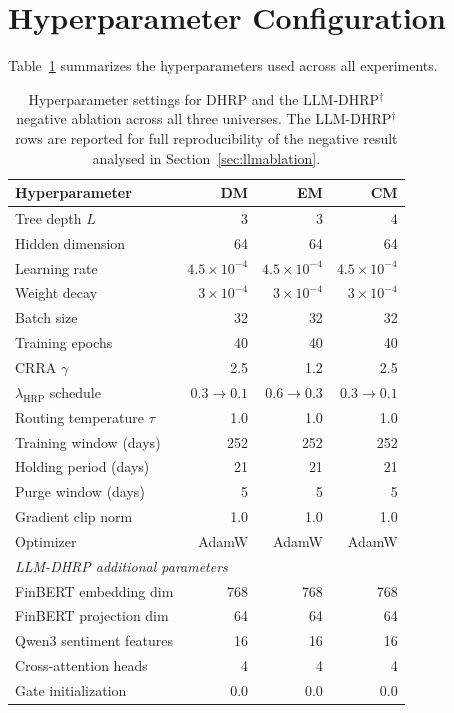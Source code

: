 \section{Hyperparameter Configuration}
\label{app:hyperparams}

Table~\ref{tab:hyperparams} summarizes the hyperparameters used across all experiments.

\begin{table}[h]
\centering
\caption{Hyperparameter settings for DHRP and the LLM-DHRP$^{\dagger}$ negative ablation across all three universes. The LLM-DHRP$^{\dagger}$ rows are reported for full reproducibility of the negative result analysed in Section~\ref{sec:llmablation}.}
\label{tab:hyperparams}
\begin{tabular}{lrrr}
\toprule
Hyperparameter & DM & EM & CM \\
\midrule
Tree depth $L$ & 3 & 3 & 4 \\
Hidden dimension & 64 & 64 & 64 \\
Learning rate & $4.5 \times 10^{-4}$ & $4.5 \times 10^{-4}$ & $4.5 \times 10^{-4}$ \\
Weight decay & $3 \times 10^{-4}$ & $3 \times 10^{-4}$ & $3 \times 10^{-4}$ \\
Batch size & 32 & 32 & 32 \\
Training epochs & 40 & 40 & 40 \\
CRRA $\gamma$ & 2.5 & 1.2 & 2.5 \\
$\lambda_{\text{HRP}}$ schedule & $0.3 \to 0.1$ & $0.6 \to 0.3$ & $0.3 \to 0.1$ \\
Routing temperature $\tau$ & 1.0 & 1.0 & 1.0 \\
Training window (days) & 252 & 252 & 252 \\
Holding period (days) & 21 & 21 & 21 \\
Purge window (days) & 5 & 5 & 5 \\
Gradient clip norm & 1.0 & 1.0 & 1.0 \\
Optimizer & AdamW & AdamW & AdamW \\
\midrule
\multicolumn{4}{l}{\textit{LLM-DHRP additional parameters}} \\
FinBERT embedding dim & 768 & 768 & 768 \\
FinBERT projection dim & 64 & 64 & 64 \\
Qwen3 sentiment features & 16 & 16 & 16 \\
Cross-attention heads & 4 & 4 & 4 \\
Gate initialization & 0.0 & 0.0 & 0.0 \\
\bottomrule
\end{tabular}
\end{table}

